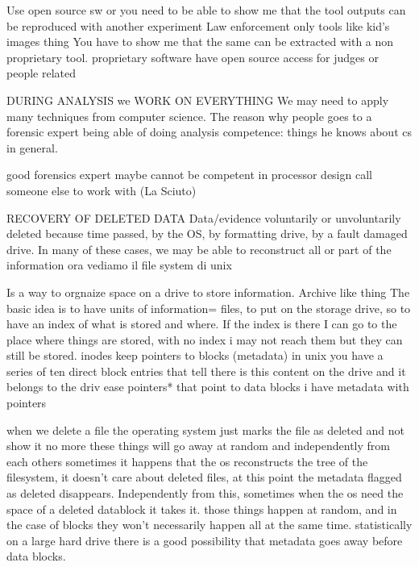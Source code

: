         Use open source sw or you need to be able to show me that the tool outputs can be reproduced with another experiment
        Law enforcement only tools like kid's images thing 
        You have to show me that the same can be extracted with a non proprietary tool.
        proprietary software have open source access for judges or people related 

    DURING ANALYSIS we WORK ON EVERYTHING
        We may need to apply many techniques from computer science.
        The reason why people goes to a forensic expert 
            being able of doing analysis 
            competence: things he knows about cs in general.

            good forensics expert maybe cannot be competent in processor design 
            call someone else to work with (La Sciuto)

    RECOVERY OF DELETED DATA 
        Data/evidence voluntarily or unvoluntarily deleted because time passed, by the OS, by formatting drive, by a fault damaged drive.
        In many of these cases, we may be able to reconstruct all or part of the information 
        ora vediamo il file system di unix 

            Is a way to orgnaize space on a drive to store information. Archive like thing 
            The basic idea is to have units of information= files, to put on the storage drive, so to have an index of what is stored and where.
            If the index is there I can go to the place where things are stored, with no index i may not reach them but they can still be stored.
            inodes keep pointers to blocks (metadata)
            in unix you have a series of ten direct block entries that tell there is this content on the drive and it belongs to the driv ease
            pointers* that point to data blocks 
            i have metadata with pointers 

        when we delete a file the operating system just marks the file as deleted and not show it no more 
        these things will go away at random and independently from each others 
        sometimes it happens that the os reconstructs the tree of the filesystem, it doesn't care about deleted files, at this point the metadata flagged as deleted disappears.
        Independently from this, sometimes when the os need the space of a deleted datablock it takes it.
        those things happen at random, and in the case of blocks they won't necessarily happen all at the same time.
        statistically on a large hard drive there is a good possibility that metadata goes away before data blocks.

